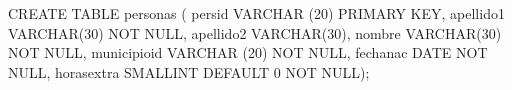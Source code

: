 \lstset{caption=Crear tabla ``personas'',label=sql:crearTablaPersonas}
\begin{SQL}
CREATE TABLE personas (
persid VARCHAR (20) PRIMARY KEY,
apellido1 VARCHAR(30) NOT NULL,
apellido2 VARCHAR(30),
nombre VARCHAR(30) NOT NULL,
municipioid VARCHAR (20) NOT NULL,
fechanac DATE NOT NULL,
horasextra SMALLINT DEFAULT 0 NOT NULL);
\end{SQL}
